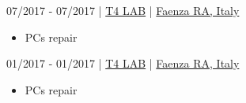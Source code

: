 \documentclass{article}
\begin{document}
\begin{paracol}{2}
\begin{tcolorbox}[title=\emoji{hammer-and-wrench} Computer Technician Internship,colback=white]
     07/2017 - 07/2017 \hfill | \hfill
    \href{https://www.t4lab.it/}{ T4 LAB} \hfill | \hfill
    \href{https://www.openstreetmap.org/node/4751590216}{ Faenza RA, Italy}

    \tcblower

    \begin{itemize}
        \item {} PCs repair
    \end{itemize}
\end{tcolorbox}

\begin{tcolorbox}[title=\emoji{hammer-and-wrench} Computer Technician PCTO (work/school),colback=white]
     01/2017 - 01/2017 \hfill | \hfill
    \href{https://www.t4lab.it/}{ T4 LAB} \hfill | \hfill
    \href{https://www.openstreetmap.org/node/4751590216}{ Faenza RA, Italy}

    \tcblower

    \begin{itemize}
        \item {} PCs repair
    \end{itemize}
\end{tcolorbox}

\end{paracol}
\end{document}
